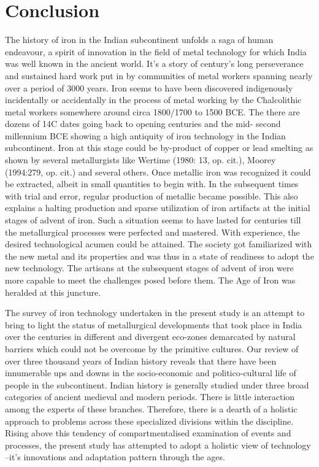\chapter{Conclusion}\label{chapter8}




The history of iron in the Indian subcontinent unfolds a saga of human endeavour, a spirit of innovation in the field of metal technology for which India was well known in the ancient world. It’s a story of century’s long perseverance and sustained hard work put in by communities of metal workers spanning nearly over a period of 3000 years. Iron seems to have been discovered indigenously incidentally or accidentally in the process of metal working by the Chalcolithic metal workers somewhere around circa 1800/1700 to 1500 BCE. The there are dozens of 14C dates going back to opening centuries and the mid- second millennium BCE showing a high antiquity of iron technology in the Indian subcontinent. Iron at this stage could be by-product of copper or lead smelting as shown by several metallurgists like Wertime (1980: 13, op. cit.), Moorey (1994:279, op. cit.) and several others. Once metallic iron was recognized it could be extracted, albeit in small quantities to begin with. In the subsequent times with trial and error, regular production of metallic became possible. This also explains a halting production and sparse utilization of iron artifacts at the initial stages of advent of iron. Such a situation seems to have lasted for centuries till the metallurgical processes were perfected and mastered. With experience, the desired technological acumen could be attained. The society got familiarized with the new metal and its properties and was thus in a state of readiness to adopt the new technology. The artisans at the subsequent stages of advent of iron were more capable to meet the challenges posed before them. The Age of Iron was heralded at this juncture.  

The survey of iron technology undertaken in the present study is an attempt to bring to light the status of metallurgical developments that took place in India over the centuries in different and divergent eco-zones demarcated by natural barriers which could not be overcome by the primitive cultures. Our review of over three thousand years of Indian history reveals that there have been innumerable ups and downs in the socio-economic and politico-cultural life of people in the subcontinent. Indian history is generally studied under three broad categories of ancient medieval and modern periods. There is little interaction among the experts of these branches. Therefore, there is a dearth of a holistic approach to problems across these specialized divisions within the discipline. Rising above this tendency of compartmentalised examination of events and processes, the present study has attempted to adopt a holistic view of technology –it’s innovations and adaptation pattern through the ages. 

